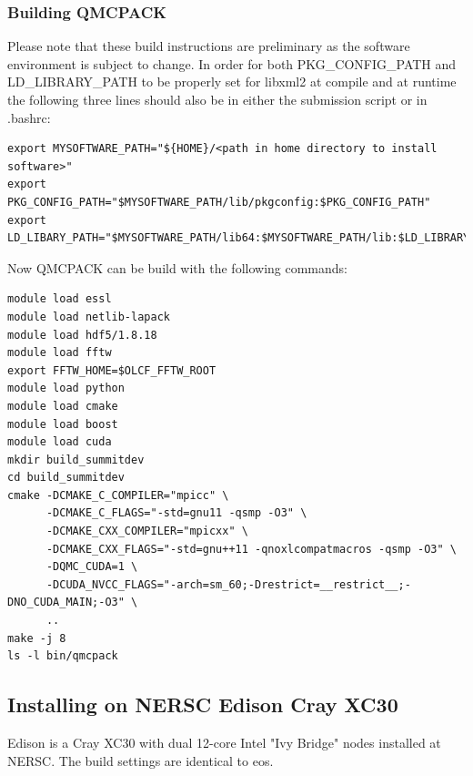 \subsubsection{Building QMCPACK}
Please note that these build instructions are preliminary as the
software environment is subject to change. In order for both
PKG\_CONFIG\_PATH and LD\_LIBRARY\_PATH to be properly set for libxml2
at compile and at runtime the following three lines should also be
in either the submission script or in .bashrc:
\begin{verbatim}
export MYSOFTWARE_PATH="${HOME}/<path in home directory to install software>"
export PKG_CONFIG_PATH="$MYSOFTWARE_PATH/lib/pkgconfig:$PKG_CONFIG_PATH"
export LD_LIBARY_PATH="$MYSOFTWARE_PATH/lib64:$MYSOFTWARE_PATH/lib:$LD_LIBRARY_PATH"
\end{verbatim}
Now QMCPACK can be build with the following commands:
\begin{verbatim}
module load essl
module load netlib-lapack
module load hdf5/1.8.18
module load fftw
export FFTW_HOME=$OLCF_FFTW_ROOT
module load python
module load cmake
module load boost
module load cuda
mkdir build_summitdev
cd build_summitdev
cmake -DCMAKE_C_COMPILER="mpicc" \
      -DCMAKE_C_FLAGS="-std=gnu11 -qsmp -O3" \
      -DCMAKE_CXX_COMPILER="mpicxx" \
      -DCMAKE_CXX_FLAGS="-std=gnu++11 -qnoxlcompatmacros -qsmp -O3" \
      -DQMC_CUDA=1 \
      -DCUDA_NVCC_FLAGS="-arch=sm_60;-Drestrict=__restrict__;-DNO_CUDA_MAIN;-O3" \
      ..
make -j 8
ls -l bin/qmcpack
\end{verbatim}

\subsection{Installing on NERSC Edison Cray XC30}

Edison is a Cray XC30 with dual 12-core Intel "Ivy Bridge" nodes
installed at NERSC. The build settings are identical to eos.

